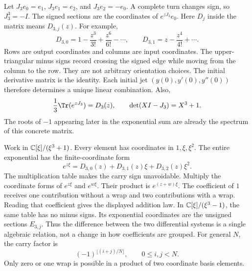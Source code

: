 Let $J_3e_0=e_1$, $J_3e_1=e_2$, and $J_3e_2=-e_0$. A complete turn changes sign, so $J_3^3=-I$. The signed sections are the coordinates of $e^{zJ_3}e_0$.
Here $D_j$ inside the matrix means $D_{3,j}(z)$. For example,
\[
D_{3,0}=1-\frac{z^3}{3!}+\frac{z^6}{6!}-\cdots,
\qquad D_{3,1}=z-\frac{z^4}{4!}+\cdots.
\]
Rows are output coordinates and columns are input coordinates. The upper-triangular minus signs record crossing the signed edge while moving from the column to the row. They are not arbitrary orientation choices.
The initial derivative matrix is the identity. Each initial jet $(y(0),y'(0),y''(0))$ therefore determines a unique linear combination. Also,
\[
\frac13\Tr(e^{zJ_3})=D_3(z),\qquad \det(XI-J_3)=X^3+1.
\]
The roots of $-1$ appearing later in the exponential sum are already the spectrum of this concrete matrix.

Work in $\mathbb C[\xi]/(\xi^3+1)$. Every element has coordinates in $1,\xi,\xi^2$. The entire exponential has the finite-coordinate form
\[
e^{z\xi}=D_{3,0}(z)+D_{3,1}(z)\xi+D_{3,2}(z)\xi^2.
\]
The multiplication table makes the carry sign unavoidable.
Multiply the coordinate forms of $e^{z\xi}$ and $e^{w\xi}$. Their product is $e^{(z+w)\xi}$. The coefficient of $1$ receives one contribution without a wrap and two contributions with a wrap. Reading that coefficient gives the displayed addition law.
In $\mathbb C[\xi]/(\xi^3-1)$, the same table has no minus signs. Its exponential coordinates are the unsigned sections $E_{3,j}$. Thus the difference between the two differential systems is a single algebraic relation, not a change in how coefficients are grouped.
For general $N$, the carry factor is
\[
(-1)^{\lfloor(i+j)/N\rfloor},\qquad 0\le i,j<N.
\]
Only zero or one wrap is possible in a product of two coordinate basis elements.

